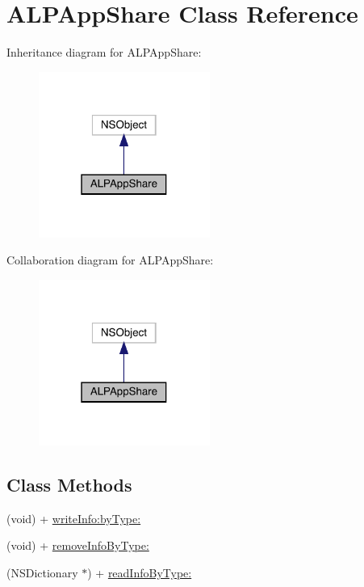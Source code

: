\hypertarget{interface_a_l_p_app_share}{}\section{A\+L\+P\+App\+Share Class Reference}
\label{interface_a_l_p_app_share}


Inheritance diagram for A\+L\+P\+App\+Share\+:\nopagebreak
\begin{figure}[H]
\begin{center}
\leavevmode
\includegraphics[width=159pt]{interface_a_l_p_app_share__inherit__graph}
\end{center}
\end{figure}


Collaboration diagram for A\+L\+P\+App\+Share\+:\nopagebreak
\begin{figure}[H]
\begin{center}
\leavevmode
\includegraphics[width=159pt]{interface_a_l_p_app_share__coll__graph}
\end{center}
\end{figure}
\subsection*{Class Methods}
\begin{DoxyCompactItemize}
\item 
(void) + \mbox{\hyperlink{interface_a_l_p_app_share_a055d75e9f6ae9aa950b321cf96681799}{write\+Info\+:by\+Type\+:}}
\item 
(void) + \mbox{\hyperlink{interface_a_l_p_app_share_a9422f46b4191c59c4d4557a74ee083a7}{remove\+Info\+By\+Type\+:}}
\item 
(N\+S\+Dictionary $\ast$) + \mbox{\hyperlink{interface_a_l_p_app_share_a90323c186d7ccbaf97b24a2bf7f9729f}{read\+Info\+By\+Type\+:}}
\end{DoxyCompactItemize}


